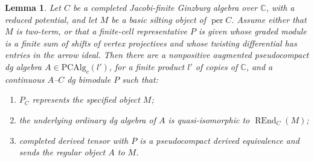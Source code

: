 \documentclass[12pt,a4paper,english,reqno]{amsart}
\theoremstyle{plain}
\newtheorem{lem}[thm]{Lemma}
\theoremstyle{definition}
\numberwithin{equation}{section}
\def\perf{\operatorname{per}}
\def\bbC{{\mathbb C}}
\def\REnd{\operatorname{REnd}}
\begin{document}
\begin{lem}\label{lem:pointed-pc}
Let $C$ be a completed Jacobi-finite Ginzburg algebra over $\bbC$, with a reduced potential, and let $M$ be a basic silting object of $\perf C$. Assume either that $M$ is two-term, or that a finite-cell representative $P$ is given whose graded module is a finite sum of shifts of vertex projectives and whose twisting differential has entries in the arrow ideal. Then there are a nonpositive augmented pseudocompact dg algebra $A\in\mathrm{PCAlg}_c(l')$, for a finite product $l'$ of copies of $\bbC$, and a continuous $A$--$C$ dg bimodule $P$ such that:
\begin{enumerate}[label=(\roman*)]
\item $P_C$ represents the specified object $M$;
\item the underlying ordinary dg algebra of $A$ is quasi-isomorphic to $\REnd_C(M)$;
\item completed derived tensor with $P$ is a pseudocompact derived equivalence and sends the regular object $A$ to $M$.
\end{enumerate}
\end{lem}
\end{document}
